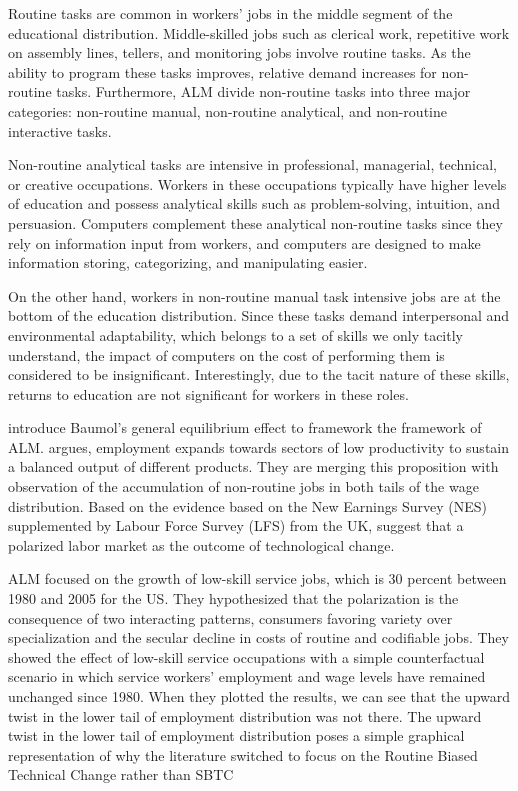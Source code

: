 \begin{onehalfspace}
Routine tasks are common in workers' jobs in the middle segment of
the educational distribution. Middle-skilled jobs such as clerical
work, repetitive work on assembly lines, tellers, and monitoring jobs
involve routine tasks. As the ability to program these tasks improves,
relative demand increases for non-routine tasks. Furthermore, ALM
divide non-routine tasks into three major categories: non-routine
manual, non-routine analytical, and non-routine interactive tasks.

Non-routine analytical tasks are intensive in professional, managerial,
technical, or creative occupations. Workers in these occupations typically
have higher levels of education and possess analytical skills such
as problem-solving, intuition, and persuasion. Computers complement
these analytical non-routine tasks since they rely on information
input from workers, and computers are designed to make information
storing, categorizing, and manipulating easier.

On the other hand, workers in non-routine manual task intensive jobs
are at the bottom of the education distribution. Since these tasks
demand interpersonal and environmental adaptability, which belongs
to a set of skills we only tacitly understand, the impact of computers
on the cost of performing them is considered to be insignificant.
Interestingly, due to the tacit nature of these skills, returns to
education are not significant for workers in these roles.

\citet{2007Goos} introduce Baumol's \citeyearpar{1967Baumol} general
equilibrium effect to framework the framework of ALM. \citet{1967Baumol}
argues, employment expands towards sectors of low productivity to
sustain a balanced output of different products. They are merging
this proposition with observation of the accumulation of non-routine
jobs in both tails of the wage distribution. Based on the evidence
based on the New Earnings Survey (NES) supplemented by Labour Force
Survey (LFS) from the UK, \citet{2007Goos} suggest that a polarized
labor market as the outcome of technological change.

ALM focused on the growth of low-skill service jobs, which is 30 percent
between 1980 and 2005 for the US. They hypothesized that the polarization
is the consequence of two interacting patterns, consumers favoring
variety over specialization and the secular decline in costs of routine
and codifiable jobs. They showed the effect of low-skill service occupations
with a simple counterfactual scenario in which service workers' employment
and wage levels have remained unchanged since 1980. When they plotted
the results, we can see that the upward twist in the lower tail of
employment distribution was not there. The upward twist in the lower
tail of employment distribution poses a simple graphical representation
of why the literature switched to focus on the Routine Biased Technical
Change rather than SBTC
\end{onehalfspace}
